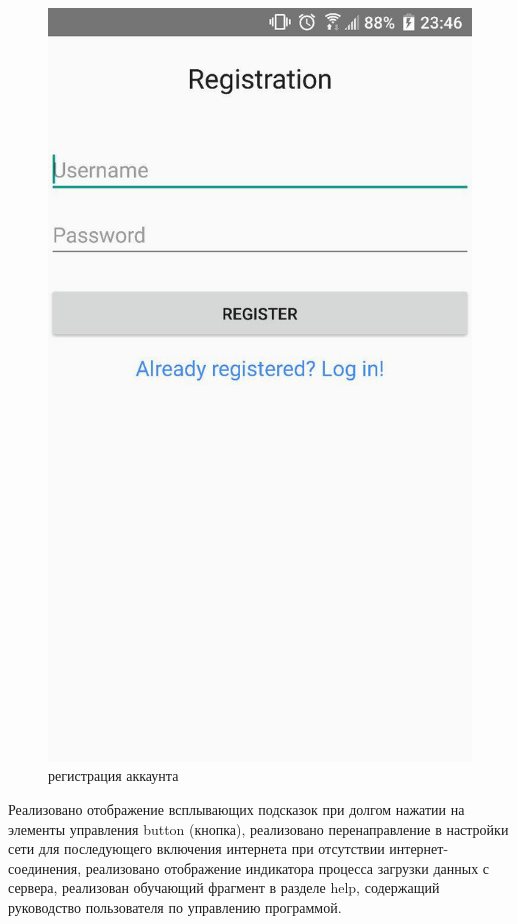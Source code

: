 \begin{figure}[h!]
    \includegraphics[height=0.42\textheight]{./screenshots/3/register.jpg}
    \caption{\small{регистрация аккаунта}}
    \endminipage{}
\end{figure}


Реализовано отображение всплывающих подсказок при долгом нажатии на элементы
управления button (кнопка), реализовано перенаправление в настройки сети для
последующего включения интернета при отсутствии интернет-соединения,
реализовано отображение индикатора процесса загрузки данных с сервера,
реализован обучающий фрагмент в разделе help, содержащий руководство
пользователя по управлению программой.

